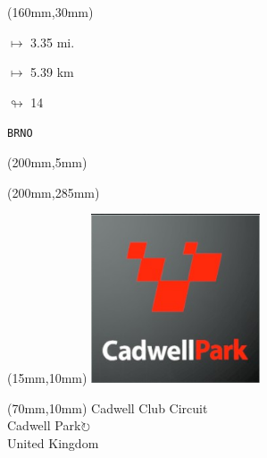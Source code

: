 \begin{textblock*}{40mm}(160mm,30mm)%
\Large
\par$\mapsto$ 3.35 mi.
\par$\mapsto$ 5.39 km
\par$\looparrowright$ 14
\par\hfill\tiny\tt BRNO\\
\end{textblock*}
\begin{textblock*}{20mm}(200mm,5mm)%
\fbox{\thepage}
\label{BRNO}
\end{textblock*}
\begin{textblock*}{20mm}(200mm,285mm)%
\fbox{\thepage}
\end{textblock*}

\null\newpage
\begin{textblock*}{50mm}(15mm,10mm)%
\includegraphics[width=50mm]{LG/2015-05-20_00076.png}
\end{textblock*}
\begin{textblock*}{130mm}(70mm,10mm)%
{\fontsize{20}{20}\selectfont Cadwell Club Circuit\\}
{\fontsize{16}{16}\selectfont Cadwell Park\hfill \Large$\circlearrowright$\\}
{\fontsize{12}{12}\selectfont United Kingdom\\}
\end{textblock*}
